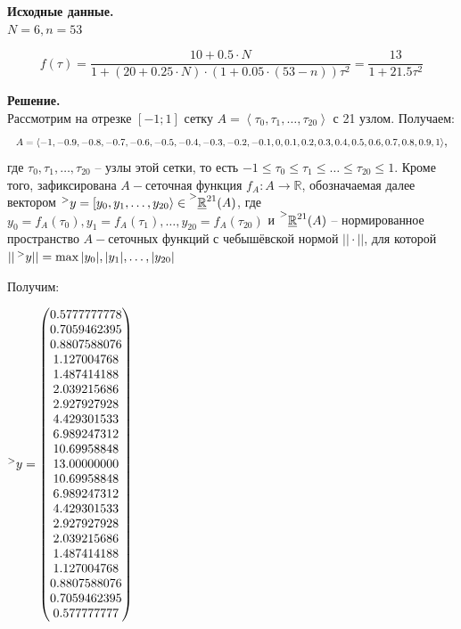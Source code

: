\documentclass[14pt,a4paper]{scrartcl}
\begin{document}
\textbf{Исходные данные.}\\
$N = 6, n = 53$

\begin{equation*}
f(\tau) = \frac{10+0.5 \cdot N}{1+(20+0.25\cdot N)\cdot(1+0.05\cdot(53-n))\tau^2} = \frac{13}{1+21.5\tau^2}
\end{equation*}

\textbf{Решение.}\\
Рассмотрим на отрезке $[-1;1]$ сетку $A = \left\langle \tau_0, \tau_1, \ldots, \tau_{20}\right\rangle $ с 21 узлом. Получаем: 
\begin{equation*}
	\resizebox{1\hsize}{!}
	{$A = \langle -1, - 0.9, - 0.8, - 0.7, - 0.6, - 0.5, - 0.4, - 0.3, - 0.2, - 0.1, 0, 0.1, 0.2, 0.3, 0.4, 0.5, 0.6, 0.7, 0.8, 0.9, 1 \rangle$},
\end{equation*}
где $\tau_0, \tau_1, \ldots, \tau_{20}$ -- узлы этой сетки, то есть $-1 \leq \tau_0 \leq \tau_1 \leq \ldots \leq  \tau_{20} \leq 1$. Кроме того, зафиксирована $A-$сеточная функция $f_A:A\rightarrow\mathbb{R}$, обозначаемая далее вектором $\prescript{>}{}{y} = \left[ y_0, y_1, \ldots, y_{20} \right> \in \prescript{>}{}{\underline{\mathbb{R}}^{21}}(A)$, где $y_0=f_A(\tau_0), y_1=f_A(\tau_1), \ldots, y_{20}=f_A(\tau_20)$ и $\prescript{>}{}{\underline{\mathbb{R}}^{21}}(A)$ -- нормированное пространство $A-$сеточных функций с чебышёвской нормой $||\cdot||$, для которой $||\prescript{>}{}{y}|| = \max{|y_0|, |y_1|, \ldots, |y_{20}|}$

Получим:
	\pagebreak
\begin{table}[]
	\centering
	$\prescript{>}{}{y} = 
	\begin{pmatrix}
		0.5777777778 \\
		0.7059462395 \\
		0.8807588076 \\
		1.127004768  \\
		1.487414188  \\
		2.039215686  \\
		2.927927928  \\
		4.429301533  \\
		6.989247312  \\
		10.69958848  \\
		13.00000000  \\
		10.69958848  \\
		6.989247312  \\
		4.429301533  \\
		2.927927928  \\
		2.039215686  \\
		1.487414188  \\
		1.127004768  \\
		0.8807588076 \\
		0.7059462395 \\
		0.577777777
	\end{pmatrix}$
\end{table}
\end{document}
